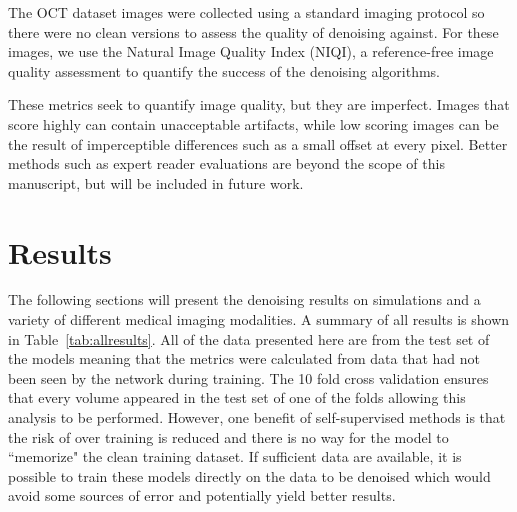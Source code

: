 \documentclass[12pt]{spieman}
\begin{document}
\begin{spacing}{2}
The OCT dataset images were collected using a standard imaging protocol so there were no clean versions to assess the quality of denoising against. For these images, we use the Natural Image Quality Index (NIQI), a reference-free image quality assessment to quantify the success of the denoising algorithms\cite{Mittal2013}.

These metrics seek to quantify image quality, but they are imperfect. Images that score highly can contain unacceptable artifacts, while low scoring images can be the result of imperceptible differences such as a small offset at every pixel. Better methods such as expert reader evaluations are beyond the scope of this manuscript, but will be included in future work.

\section{Results}

The following sections will present the denoising results on simulations and a variety of different medical imaging modalities. A summary of all results is shown in Table~\ref{tab:allresults}. All of the data presented here are from the test set of the models meaning that the metrics were calculated from data that had not been seen by the network during training. The 10 fold cross validation ensures that every volume appeared in the test set of one of the folds allowing this analysis to be performed. However, one benefit of self-supervised methods is that the risk of over training is reduced and there is no way for the model to ``memorize" the clean training dataset. If sufficient data are available, it is possible to train these models directly on the data to be denoised which would avoid some sources of error and potentially yield better results.


\end{spacing}
\end{document}
